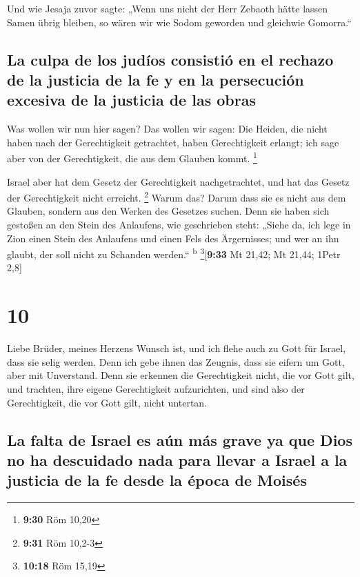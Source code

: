  Und wie Jesaja zuvor sagte: „Wenn uns nicht der Herr
Zebaoth hätte lassen Samen übrig bleiben, so wären wir wie Sodom
geworden und gleichwie Gomorra.``

\hypertarget{la-culpa-de-los-juduxedos-consistiuxf3-en-el-rechazo-de-la-justicia-de-la-fe-y-en-la-persecuciuxf3n-excesiva-de-la-justicia-de-las-obras}{%
\subsection{La culpa de los judíos consistió en el rechazo de la
justicia de la fe y en la persecución excesiva de la justicia de las
obras}\label{la-culpa-de-los-juduxedos-consistiuxf3-en-el-rechazo-de-la-justicia-de-la-fe-y-en-la-persecuciuxf3n-excesiva-de-la-justicia-de-las-obras}}

 Was wollen wir nun hier sagen? Das wollen wir sagen: Die
Heiden, die nicht haben nach der Gerechtigkeit getrachtet, haben
Gerechtigkeit erlangt; ich sage aber von der Gerechtigkeit, die aus dem
Glauben kommt. \footnote{\textbf{9:30} Röm 10,20}

 Israel aber hat dem Gesetz der Gerechtigkeit
nachgetrachtet, und hat das Gesetz der Gerechtigkeit nicht erreicht.
\footnote{\textbf{9:31} Röm 10,2-3}  Warum das? Darum
dass sie es nicht aus dem Glauben, sondern aus den Werken des Gesetzes
suchen. Denn sie haben sich gestoßen an den Stein des Anlaufens,
 wie geschrieben steht: „Siehe da, ich lege in Zion einen
Stein des Anlaufens und einen Fels des Ärgernisses; und wer an ihn
glaubt, der soll nicht zu Schanden werden.`` \textsuperscript{b}
\footnote{\textbf{10:18} Röm 15,19}{[}\textbf{9:33} Mt 21,42; Mt 21,44;
1Petr 2,8{]}

\hypertarget{section-9}{%
\section{10}\label{section-9}}

 Liebe Brüder, meines Herzens Wunsch ist, und ich flehe
auch zu Gott für Israel, dass sie selig werden.  Denn ich
gebe ihnen das Zeugnis, dass sie eifern um Gott, aber mit Unverstand.
 Denn sie erkennen die Gerechtigkeit nicht, die vor Gott
gilt, und trachten, ihre eigene Gerechtigkeit aufzurichten, und sind
also der Gerechtigkeit, die vor Gott gilt, nicht untertan.

\hypertarget{la-falta-de-israel-es-auxfan-muxe1s-grave-ya-que-dios-no-ha-descuidado-nada-para-llevar-a-israel-a-la-justicia-de-la-fe-desde-la-uxe9poca-de-moisuxe9s}{%
\subsection{La falta de Israel es aún más grave ya que Dios no ha
descuidado nada para llevar a Israel a la justicia de la fe desde la
época de
Moisés}\label{la-falta-de-israel-es-auxfan-muxe1s-grave-ya-que-dios-no-ha-descuidado-nada-para-llevar-a-israel-a-la-justicia-de-la-fe-desde-la-uxe9poca-de-moisuxe9s}}

